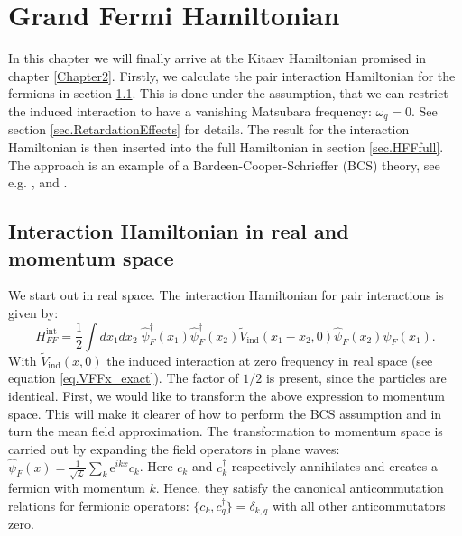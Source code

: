
\chapter{Grand Fermi Hamiltonian} %

\label{Chapter4} %


In this chapter we will finally arrive at the Kitaev Hamiltonian promised in chapter \ref{Chapter2}. Firstly, we calculate the pair interaction Hamiltonian for the fermions in section \ref{sec.HFFint}. This is done under the assumption, that we can restrict the induced interaction to have a vanishing Matsubara frequency: $\omega_q = 0$. See section \ref{sec.RetardationEffects} for details. The result for the interaction Hamiltonian is then inserted into the full Hamiltonian in section \ref{sec.HFFfull}. The approach is an example of a Bardeen-Cooper-Schrieffer (BCS) theory, see e.g. \cite[chapter 3]{Tinkham}, \cite[pp. 153-163]{LandauStatPhys2} and \cite[pp. 359-369]{PlischkeStatPhys}. 

\section{Interaction Hamiltonian in real and momentum space} \label{sec.HFFint}
We start out in real space. The interaction Hamiltonian for pair interactions is given by:
\begin{equation}
H^\text{int}_{FF} = \frac{1}{2}\int dx_1dx_2\; \hat{\psi}^\dagger_F(x_1)\hat{\psi}^\dagger_F(x_2)\tilde{V}_{\text{ind}}(x_1-x_2,0) \hat{\psi}_F(x_2) \hat{\psi}_F(x_1).
\label{eq.HFFintdef}
\end{equation}
With $\tilde{V}_\text{ind}(x,0)$ the induced interaction at zero frequency in real space (see equation \eqref{eq.VFFx_exact}). The factor of $1/2$ is present, since the particles are identical. First, we would like to transform the above expression to momentum space. This will make it clearer of how to perform the BCS assumption and in turn the mean field approximation. The transformation to momentum space is carried out by expanding the field operators in plane waves: $\hat{\psi}_F(x) = \frac{1}{\sqrt{\mathcal{L}}}\sum_k \text{e}^{ikx} c_k$. Here $c_k$ and $c^\dagger_k$ respectively annihilates and creates a fermion with momentum $k$. Hence, they satisfy the canonical anticommutation relations for fermionic operators: $\{c_k, c^\dagger_q\} = \delta_{k,q}$ with all other anticommutators zero.  

